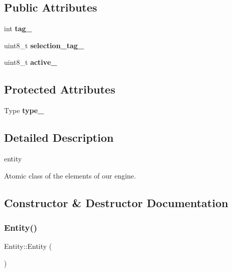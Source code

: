 \subsection*{Public Attributes}
\begin{DoxyCompactItemize}
\item 
\mbox{\label{class_entity_aa9f75ea7b1041547a1b610a9b2f064c0}} 
int {\bfseries tag\+\_\+}
\item 
\mbox{\label{class_entity_a6f99bc47ee1c35ac95a36a5facd15e5d}} 
uint8\+\_\+t {\bfseries selection\+\_\+tag\+\_\+}
\item 
\mbox{\label{class_entity_a7816e789062febe058b98ce695539c59}} 
uint8\+\_\+t {\bfseries active\+\_\+}
\end{DoxyCompactItemize}
\subsection*{Protected Attributes}
\begin{DoxyCompactItemize}
\item 
\mbox{\label{class_entity_a4fa6e00c39af69477dc64c27e29ab77e}} 
Type {\bfseries type\+\_\+}
\end{DoxyCompactItemize}


\subsection{Detailed Description}
entity 

Atomic class of the elements of our engine. 

\subsection{Constructor \& Destructor Documentation}
\mbox{\label{class_entity_a980f368aa07ce358583982821533a54a}} 
\subsubsection{\texorpdfstring{Entity()}{Entity()}\hspace{0.1cm}{\footnotesize\ttfamily [1/2]}}
{\footnotesize\ttfamily Entity\+::\+Entity (\begin{DoxyParamCaption}{ }\end{DoxyParamCaption})}




